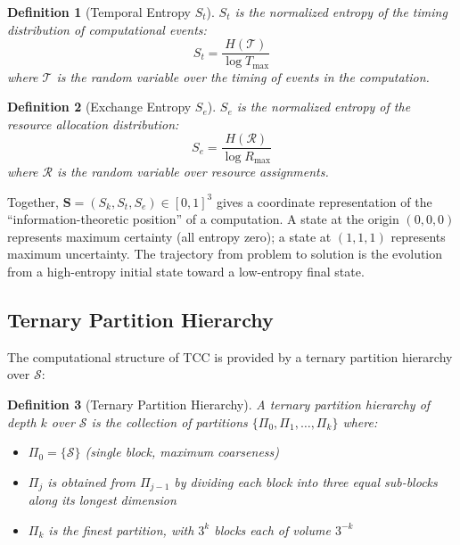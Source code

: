 \documentclass[12pt,twocolumn]{article}
\newtheorem{definition}{Definition}[section]
\begin{document}
\begin{definition}[Temporal Entropy $S_t$]
$S_t$ is the normalized entropy of the timing distribution of computational events:
\begin{equation}
S_t = \frac{H(\mathcal{T})}{\log T_{\max}}
\end{equation}
where $\mathcal{T}$ is the random variable over the timing of events in the computation.
\end{definition}

\begin{definition}[Exchange Entropy $S_e$]
$S_e$ is the normalized entropy of the resource allocation distribution:
\begin{equation}
S_e = \frac{H(\mathcal{R})}{\log R_{\max}}
\end{equation}
where $\mathcal{R}$ is the random variable over resource assignments.
\end{definition}

Together, $\mathbf{S} = (S_k, S_t, S_e) \in [0,1]^3$ gives a coordinate representation of the ``information-theoretic position'' of a computation. A state at the origin $(0,0,0)$ represents maximum certainty (all entropy zero); a state at $(1,1,1)$ represents maximum uncertainty. The trajectory from problem to solution is the evolution from a high-entropy initial state toward a low-entropy final state.

\subsection{Ternary Partition Hierarchy}

The computational structure of TCC is provided by a ternary partition hierarchy over $\mathcal{S}$:

\begin{definition}[Ternary Partition Hierarchy]
A \emph{ternary partition hierarchy} of depth $k$ over $\mathcal{S}$ is the collection of partitions $\{\Pi_0, \Pi_1, \ldots, \Pi_k\}$ where:
\begin{itemize}
\item $\Pi_0 = \{\mathcal{S}\}$ (single block, maximum coarseness)
\item $\Pi_j$ is obtained from $\Pi_{j-1}$ by dividing each block into three equal sub-blocks along its longest dimension
\item $\Pi_k$ is the finest partition, with $3^k$ blocks each of volume $3^{-k}$
\end{itemize}
\end{definition}
\end{document}
